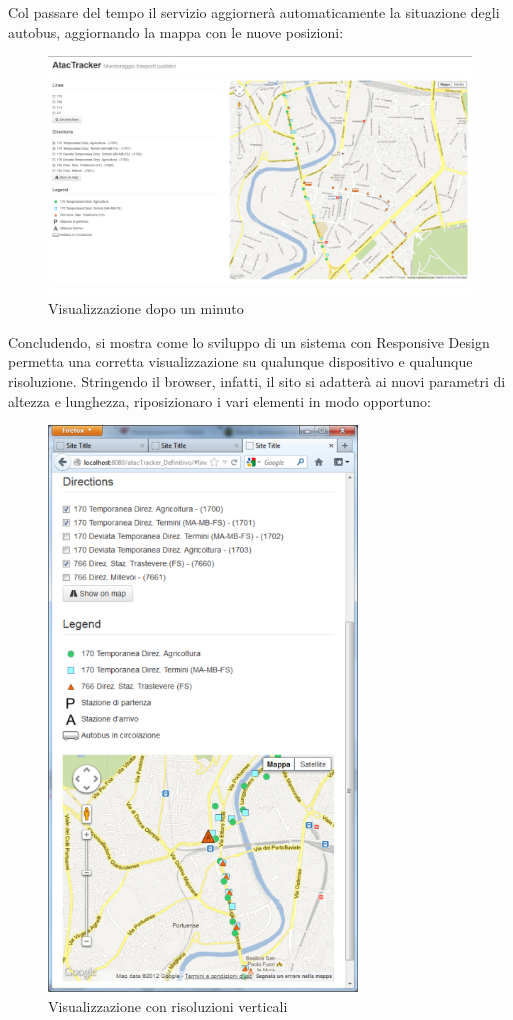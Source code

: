 Col passare del tempo il servizio aggiornerà automaticamente la situazione degli autobus, aggiornando la mappa con le nuove posizioni:

\begin{figure}[htbp]
\begin{center}
\includegraphics[width=12cm]{contents/images/bus2}
\end{center}
\caption{Visualizzazione dopo un minuto}
\label{fig:bus2}
\end{figure}
\newpage
Concludendo, si mostra come lo sviluppo di un sistema con Responsive Design permetta una corretta visualizzazione su qualunque dispositivo e qualunque risoluzione. Stringendo il browser, infatti, il sito si adatterà ai nuovi parametri di altezza e lunghezza, riposizionaro i vari elementi in modo opportuno:

\begin{figure}[htbp]
\begin{center}
\includegraphics[height=15cm]{contents/images/responsive}
\end{center}
\caption{Visualizzazione con risoluzioni verticali}
\label{fig:responsive}
\end{figure}
